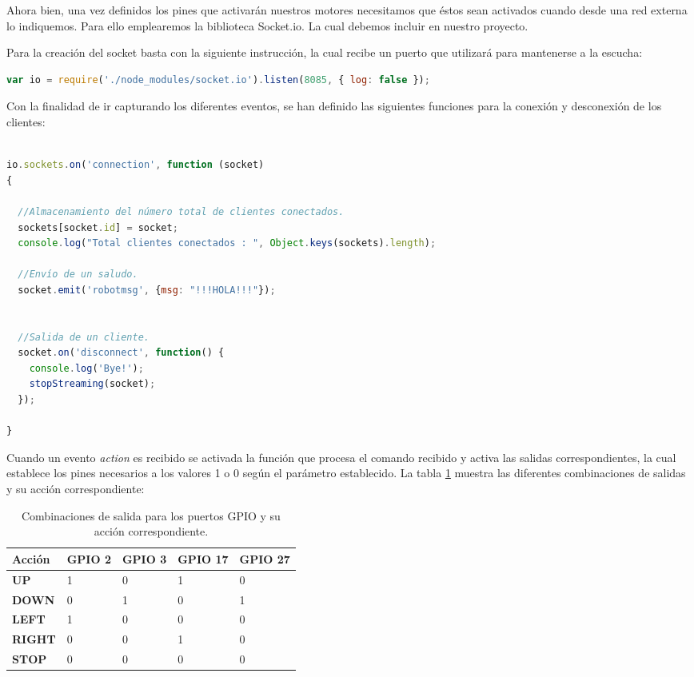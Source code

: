 Ahora bien, una vez definidos los pines que activarán nuestros motores necesitamos que éstos sean activados cuando desde una red externa lo indiquemos. Para ello emplearemos la biblioteca Socket.io. 
La cual debemos incluir en nuestro proyecto.

Para la creación del socket basta con la siguiente instrucción, la cual recibe un puerto que utilizará para mantenerse a la escucha: 

\begin{lstlisting}[language=JavaScript]
  var io = require('./node_modules/socket.io').listen(8085, { log: false });
\end{lstlisting}


Con la finalidad de ir capturando los diferentes eventos, se han definido las siguientes funciones para la conexión y desconexión de los clientes:

\begin{lstlisting}[language=JavaScript]

io.sockets.on('connection', function (socket)
{

  //Almacenamiento del número total de clientes conectados.
  sockets[socket.id] = socket;
  console.log("Total clientes conectados : ", Object.keys(sockets).length);
  
  //Envío de un saludo.
  socket.emit('robotmsg', {msg: "!!!HOLA!!!"});


  //Salida de un cliente.
  socket.on('disconnect', function() {
    console.log('Bye!');
    stopStreaming(socket);
  });  
  
}
\end{lstlisting}

Cuando un evento \emph{action} es recibido se activada la función que procesa el comando recibido y activa las salidas correspondientes, la cual establece los pines necesarios a los valores
1 o 0 según el parámetro establecido. La tabla \ref{table:table-pin-out} muestra las diferentes combinaciones de salidas y su acción correspondiente:

\begin{table}[H]
  \begin{center}
    \begin{tabular}{|p{2.5cm}|p{2.5cm}|p{2.5cm}|p{2.5cm}|p{2.5cm}|}
      \hline
      {\textbf{Acción}} & \textbf{ GPIO 2 } & \textbf{ GPIO 3 } & \textbf{  GPIO 17 } & \textbf{ GPIO 27 }\\
      \hline
      { \textbf{ UP } } & { 1 } & { 0 }  & { 1 }  & { 0 }  \\
      \hline
      { \textbf{ DOWN } } & { 0 } & { 1 }  & { 0 }  & { 1 } \\
      \hline
      { \textbf{ LEFT } } & { 1 } & { 0 }  & { 0 }  & { 0 } \\
      \hline
      { \textbf{ RIGHT } } & { 0 } & { 0 }  & { 1 }  & { 0 } \\
      \hline
      { \textbf{ STOP } } & { 0 } & { 0 }  & { 0 }  & { 0 }  \\
     \hline   
    \end{tabular}
  \end{center}
\caption{ Combinaciones de salida para los puertos GPIO y su acción correspondiente. }
\label{table:table-pin-out}
\end{table}

